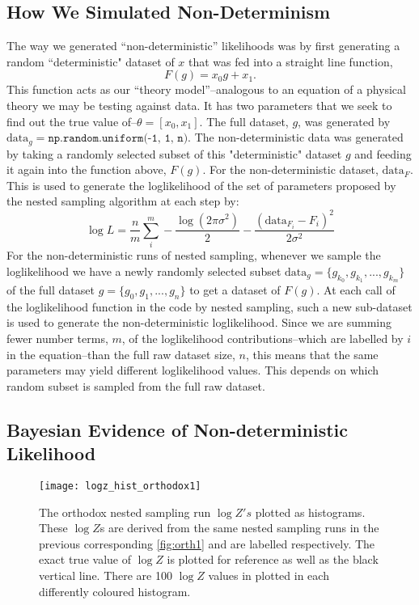 \subsection{How We Simulated Non-Determinism}
The way we generated ``non-deterministic'' likelihoods was by first generating a random ``deterministic" dataset of $x$ that was fed into a straight line function, 
\begin{equation}
F(g)= x_0g+x_1.
\end{equation}
This function acts as our ``theory model''--analogous to an equation of a physical theory we may be testing against data. It has two parameters that we seek to find out the true value of--$\theta = [x_0,x_1]$. The full dataset, $g$, was generated by $\mathrm{data}_g = \texttt{np.random.uniform(-1, 1, n)}$. The non-deterministic data was generated by taking a randomly selected subset of this "deterministic" dataset $g$ and feeding it again into the function above, $F(g)$. For the non-deterministic dataset, $\mathrm{data}_F$. This is used to generate the loglikelihood of the set of parameters proposed by the nested sampling algorithm at each step by:
%
\begin{equation}
    \log L = \frac{n}{m}\sum_i^m -\frac{\log (2\pi\sigma^2)}{2} - \frac{ (\mathrm{data}_{F_{i}} - F_i)^2}{2\sigma^2}
\end{equation}
%
For the non-deterministic runs of nested sampling, whenever we sample the loglikelihood we have a newly randomly selected subset $\mathrm{data}_g = \{ g_{k_0}, g_{k_1},...,g_{k_m}\}$ of the full dataset $g= \{ g_0,g_1,...,g_n \}$ to get a dataset of $F(g)$. At each call of the loglikelihood function in the code by nested sampling, such a new sub-dataset is used to generate the non-deterministic loglikelihood. Since we are summing fewer number terms, $m$, of the loglikelihood contributions--which are labelled by $i$ in the equation--than the full raw dataset size, $n$, this means that the same parameters may yield different loglikelihood values. This depends on which random subset is sampled from the full raw dataset.



\subsection{Bayesian Evidence of Non-deterministic Likelihood}


\begin{figure} 
\centering    
\texttt{[image: logz\_hist\_orthodox1]}
\caption[Orthodox]{The orthodox nested sampling run $\log Z's$ plotted as histograms. These $\log Z$s are derived from the same nested sampling runs in the previous corresponding \cref{fig:orth1} and are labelled respectively. The exact true value of $\log Z$ is plotted for reference as well as the black vertical line. There are 100 $\log Z$ values in plotted in each differently coloured histogram. }
\label{fig:logZ11}
\end{figure}


